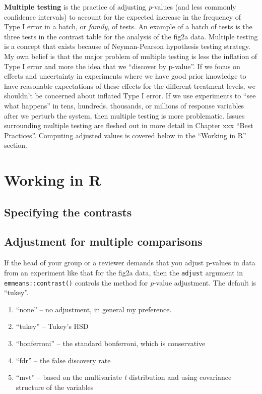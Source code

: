 \documentclass[]{book}
\providecommand{\tightlist}{%
  \setlength{\itemsep}{0pt}\setlength{\parskip}{0pt}}
\begin{document}
\textbf{Multiple testing} is the practice of adjusting \emph{p}-values (and less commonly confidence intervals) to account for the expected increase in the frequency of Type I error in a batch, or \emph{family}, of tests. An example of a batch of tests is the three tests in the contrast table for the analysis of the fig2a data. Multiple testing is a concept that exists because of Neyman-Pearson hypothesis testing strategy. My own belief is that the major problem of multiple testing is less the inflation of Type I error and more the idea that we ``discover by p-value''. If we focus on effects and uncertainty in experiments where we have good prior knowledge to have reasonable expectations of these effects for the different treatment levels, we shouldn't be concerned about inflated Type I error. If we use experiments to ``see what happens'' in tens, hundreds, thousands, or millions of response variables after we perturb the system, then multiple testing is more problematic. Issues surrounding multiple testing are fleshed out in more detail in Chapter xxx ``Best Practices''. Computing adjusted values is covered below in the ``Working in R'' section.

\hypertarget{working-in-r-1}{%
\section{Working in R}\label{working-in-r-1}}

\hypertarget{specifying-the-contrasts}{%
\subsection{Specifying the contrasts}\label{specifying-the-contrasts}}

\hypertarget{adjustment-for-multiple-comparisons}{%
\subsection{Adjustment for multiple comparisons}\label{adjustment-for-multiple-comparisons}}

If the head of your group or a reviewer demands that you adjust p-values in data from an experiment like that for the fig2a data, then the \texttt{adjust} argument in \texttt{emmeans::contrast()} controls the method for \emph{p}-value adjustment. The default is ``tukey''.

\begin{enumerate}
\def\labelenumi{\arabic{enumi}.}
\tightlist
\item
  ``none'' -- no adjustment, in general my preference.
\item
  ``tukey'' -- Tukey's HSD
\item
  ``bonferroni'' -- the standard bonferroni, which is conservative
\item
  ``fdr'' -- the false discovery rate
\item
  ``mvt'' -- based on the multivariate \emph{t} distribution and using covariance structure of the variables
\end{enumerate}
\end{document}
